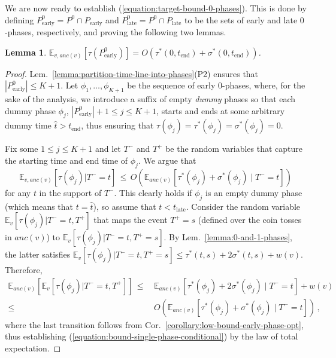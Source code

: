 \documentclass[11pt]{article}
\def\LongVersion{}
\newtheorem{lemma}[theorem]{Lemma}
\theoremstyle{definition}
\theoremstyle{plain}
\newtheorem{lemma}[theorem]{Lemma}
\theoremstyle{definition}
\theoremstyle{plain}
\newtheorem{lemma}{Lemma}[section]
\theoremstyle{definition}
\theoremstyle{plain}
\newcommand{\Lem}{Lem.}
\newcommand{\Cor}{Cor.}
\newcommand{\Expect}{\mathbb{E}}
\newcommand{\Ancestors}{\mathit{anc}}
\newcommand{\EndTime}{\mathit{t}_{\mathrm{end}}}
\newcommand{\LateTime}{\mathit{t}_{\mathrm{late}}}
\newcommand{\adv}[1]{{#1}^{*}}
\begin{document}
We are now ready to establish (\ref{equation:target-bound-0-phases}).
This is done by defining
$P^{0}_{\mathrm{early}} = P^{0} \cap P_{\mathrm{early}}$
and
$P^{0}_{\mathrm{late}} = P^{0} \cap P_{\mathrm{late}}$
to be the sets of early and late $0$-phases, respectively, and proving the
following two lemmas.

\begin{lemma} \label{lemma:bound-early-phases}
$\Expect_{v, \Ancestors(v)} \left[ \tau(P^{0}_{\mathrm{early}}) \right]
=
O \left( \adv{\tau}(0, \EndTime) + \adv{\sigma}(0, \EndTime) \right)$.
\end{lemma}
%
\LongVersion %
\begin{proof}
\Lem{}~\ref{lemma:partition-time-line-into-phases}(P2) ensures
that
$|P^{0}_{\mathrm{early}}| \leq K + 1$.
Let
$\phi_{1}, \dots, \phi_{K + 1}$
be the sequence of early $0$-phases, where, for the sake of the analysis, we
introduce a suffix of empty \emph{dummy} phases so that each dummy phase
$\phi_{j}$, $|P^{0}_{\mathrm{early}}| + 1 \leq j \leq K + 1$,
starts and ends at some arbitrary dummy time
$\hat{t} > \EndTime$,
thus ensuring that
$\tau(\phi_{j}) = \adv{\tau}(\phi_{j}) = \adv{\sigma}(\phi_{j}) = 0$.

Fix some
$1 \leq j \leq K + 1$
and let $T^{-}$ and $T^{+}$ be the random variables that capture the starting
time and end time of $\phi_{j}$.
We argue that
\begin{equation} \label{equation:bound-single-phase-conditional}
\Expect_{v, \Ancestors(v)} \left[ \tau(\phi_{j}) | T^{-} = t \right]
\, \leq \,
O \left( \Expect_{\Ancestors(v)} \left[
\adv{\tau}(\phi_{j}) + \adv{\sigma}(\phi_{j}) \mid T^{-} = t
\right] \right)
\end{equation}
for any $t$ in the support of $T^{-}$.
This clearly holds if $\phi_{j}$ is an empty dummy phase (which means that
$t = \hat{t}$),
so assume that
$t < \LateTime$.
Consider the random variable
$\Expect_{v}[\tau(\phi_{j}) | T^{-} = t, T^{+}]$
that maps the event
$T^{+} = s$
(defined over the coin tosses in $\Ancestors(v)$)
to
$\Expect_{v}[\tau(\phi_{j}) | T^{-} = t, T^{+} = s]$.
By \Lem{}~\ref{lemma:0-and-1-phases}, the latter satisfies
$\Expect_{v}[\tau(\phi_{j}) | T^{-} = t, T^{+} = s]
\leq
\adv{\tau}(t, s) + 2 \adv{\sigma}(t, s) + w(v)$.
Therefore,
\begin{align*}
\Expect_{\Ancestors(v)} \left[
\Expect_{v} \left[ \tau(\phi_{j}) | T^{-} = t, T^{+} \right]
\right]
\, \leq \, &
\Expect_{\Ancestors(v)} \left[
\adv{\tau}(\phi_{j}) + 2 \adv{\sigma}(\phi_{j}) \mid T^{-} = t
\right] + w(v) \\
\leq \, &
O \left( \Expect_{\Ancestors(v)} \left[
\adv{\tau}(\phi_{j}) + \adv{\sigma}(\phi_{j}) \mid T^{-} = t
\right] \right) \, ,
\end{align*}
where the last transition follows from
\Cor{}~\ref{corollary:low-bound-early-phase-opt},
thus establishing (\ref{equation:bound-single-phase-conditional}) by the law
of total expectation.


\end{proof}
\end{document}
